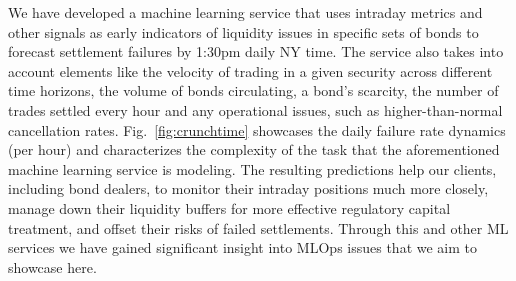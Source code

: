 We \iffalse BNY Mellon has\fi have developed a machine learning service that
uses intraday metrics
and other signals as early indicators of liquidity issues in specific sets of bonds to forecast
settlement
failures by 1:30pm daily
NY time.  The service also takes into account elements like the velocity of trading in a given security across different time horizons, the volume of bonds circulating, a bond’s scarcity, the number of trades settled every hour and any operational issues, such as higher-than-normal cancellation rates. Fig.~\ref{fig:crunchtime} showcases the daily failure rate dynamics (per hour) and characterizes the complexity of the task that the aforementioned machine learning service is modeling.
The resulting predictions help \iffalse BNY Mellon’s\fi our clients, including bond dealers, to monitor their intraday positions much more closely, manage down their liquidity buffers for more effective regulatory capital treatment, and offset their risks of failed settlements.
Through this and other ML services we have gained significant insight into MLOps issues that we aim to showcase here.


